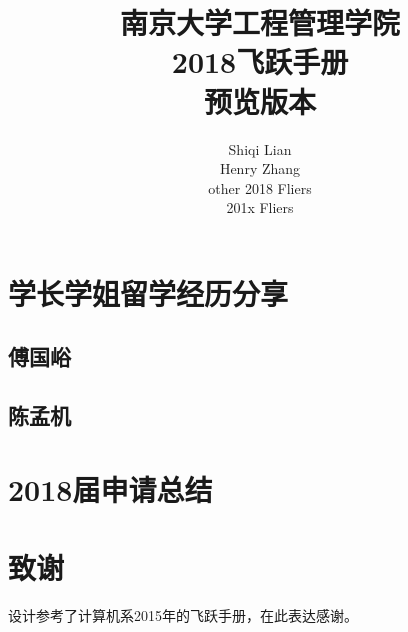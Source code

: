 \documentclass[a4paper,UTF8]{book}
\begin{document}
\title{南京大学工程管理学院\\2018飞跃手册\\预览版本}
\author{Shiqi Lian\\Henry Zhang\\other 2018 Fliers\\201x Fliers }
\maketitle %
\tableofcontents
\chapter{学长学姐留学经历分享}  %

\section{傅国峪}

\section{陈孟机}

\chapter{2018届申请总结}

\chapter{致谢}
设计参考了计算机系2015年的飞跃手册，在此表达感谢。
\end{document}
